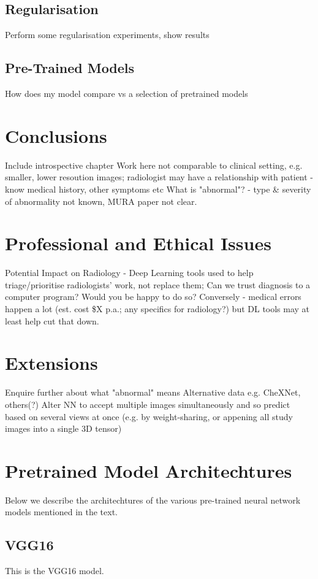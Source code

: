 \documentclass[11pt]{article} %
\theoremstyle{plain}
\theoremstyle{definition}
\begin{document}
\subsection{Regularisation}
Perform some regularisation experiments, show results

\subsection{Pre-Trained Models}
How does my model compare vs a selection of pretrained models



\newpage
\section{Conclusions}
Include introspective chapter
Work here not comparable to clinical setting, e.g. smaller, lower resoution images; radiologist may have a relationship with patient - know medical history, other symptoms etc
What is "abnormal"? - type \& severity of abnormality not known, MURA paper not clear.



\newpage
\section{Professional and Ethical Issues}
Potential Impact on Radiology - Deep Learning tools used to help triage/prioritise radiologists' work, not replace them; 
Can we trust diagnosis to a computer program? Would you be happy to do so? 
Conversely - medical errors happen a lot (est. cost \$X p.a.; any specifics for radiology?) but DL tools may at least help cut that down.



\newpage
\section{Extensions}
Enquire further about what "abnormal" means
Alternative data e.g. CheXNet, others(?)
Alter NN to accept multiple images simultaneously and so predict based on several views at once (e.g. by weight-sharing, or appening all study images into a single 3D tensor)




\clearpage



\clearpage
\appendix
\section{Pretrained Model Architechtures}
Below we describe the architechtures of the various pre-trained neural network models mentioned in the text.
\subsection{VGG16}
This is the VGG16 model.
\end{document}
